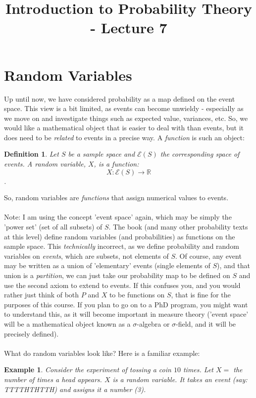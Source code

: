 \documentclass[12pt]{article} %
\title{Introduction to Probability Theory - Lecture 7}
\newtheorem{defn}{Definition}
\newtheorem{example}{Example}
\begin{document}
\maketitle
\section{Random Variables}
Up until now, we have considered probability as a map defined on the event space. This view is a bit limited, as events can become unwieldy - especially as we move on and investigate things such as expected value, variances, etc. So, we would like a mathematical object that is easier to deal with than events, but it does need to be \emph{related} to events in a precise way. A \emph{function} is such an object:
\begin{defn}
Let $S$ be a sample space and $\mathcal{E}(S)$ the corresponding space of events.  A \emph{random variable}, $X$, is a function:
$$X:\mathcal{E}(S)\rightarrow \mathbb{R}$$.
\end{defn}
So, random variables are \emph{functions} that assign numerical values to events.\\\\
Note: I am using the concept 'event space' again, which may be simply the 'power set' (set of all subsets) of $S$. The book (and many other probability texts at this level) define random variables (and probabilities) as functions on the sample space. This \emph{technically} incorrect, as we define probability and random variables on \emph{events}, which are subsets, not elements of $S$. Of course, any event may be written as a union of 'elementary' events (single elements of $S$), and that union is a \emph{partition}, we can just take our probability map to be defined on $S$ and use the second axiom to extend to events. If this confuses you, and you would rather just think of both $P$ and $X$ to be functions on $S$, that is fine for the purposes of this course. If you plan to go on to a PhD program, you might want to understand this, as it will become important in measure theory ('event space' will be a mathematical object known as a $\sigma$-algebra or $\sigma$-field, and it will be precisely defined).\\\\

What do random variables look like? Here is a familiar example:

\begin{example}
Consider the experiment of tossing a coin $10$ times. Let $X =$ the number of times a head appears. $X$ is a random variable. It takes an event (say: TTTTHTHTTH) and assigns it a number (3).
\end{example}
\end{document}
